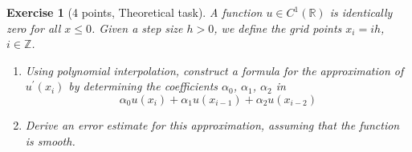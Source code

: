 \documentclass[11pt,a4paper,english,hyperref]{article}
\newcounter{aufgabeNummer}
\theoremstyle{break}   %
\newtheorem{Aufgabe}[aufgabeNummer]{Exercise}
\theoremstyle{definition}
\begin{document}
\begin{Aufgabe}[4 points, Theoretical task]
  A function $u\in C^{1}\left( \mathbb{R} \right)$ is identically zero for all $x \leq 0$. Given a step size $h > 0$, we define the grid points $x_{i}=ih$, $i\in\mathbb{Z}$.
  \begin{enumerate}
    \item Using polynomial interpolation, construct a formula for the approximation of $u^{\prime}\left( x_{i}\right)$ by determining the coefficients $\alpha_{0}$, $\alpha_{1}$, $\alpha_{2}$ in
    \begin{equation*}
      \alpha_{0} u\left(x_{i}\right)  +\alpha_{1}u\left(  x_{i-1}\right) + \alpha_{2}u\left(  x_{i-2}\right)
    \end{equation*}
    \item Derive an error estimate for this approximation, assuming that the function is smooth.
  \end{enumerate}
\end{Aufgabe}
\end{document}
